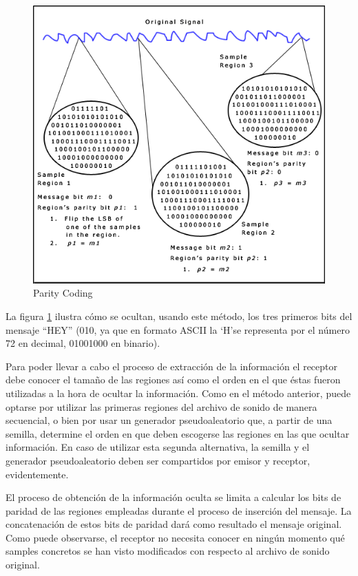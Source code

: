 \documentclass[12pt]{article}
\begin{document}
\begin{figure}
  \centering
    \includegraphics[width=\textwidth]{img/parity}
  \caption{Parity Coding}
  \label{paritycoding}
\end{figure}

La figura \ref{paritycoding} ilustra cómo se ocultan, usando este método, los tres primeros bits del mensaje ``HEY'' (010, ya que en formato ASCII la `H'\space se representa por el número 72 en decimal, 01001000 en binario).

Para poder llevar a cabo el proceso de extracción de la información el receptor debe conocer el tamaño de las regiones así como el orden en el que éstas fueron utilizadas a la hora de ocultar la información. Como en el método anterior, puede optarse por utilizar las primeras regiones del archivo de sonido de manera secuencial, o bien por usar un generador pseudoaleatorio que, a partir de una semilla, determine el orden en que deben escogerse las regiones en las que ocultar información. En caso de utilizar esta segunda alternativa, la semilla y el generador pseudoaleatorio deben ser compartidos por emisor y receptor, evidentemente.

El proceso de obtención de la información oculta se limita a calcular los bits de paridad de las regiones empleadas durante el proceso de inserción del mensaje. La concatenación de estos bits de paridad dará como resultado el mensaje original. Como puede observarse, el receptor no necesita conocer en ningún momento qué samples concretos se han visto modificados con respecto al archivo de sonido original.
\end{document}
